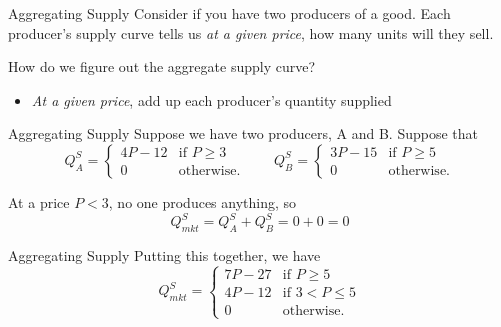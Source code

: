 \documentclass[12pt,t]{beamer}
\begin{document}
\begin{frame}{Aggregating Supply}
  Consider if you have two producers of a good. Each producer's supply curve tells us \emph{at a given price}, how many units will they sell.

  \bigskip
  How do we figure out the aggregate supply curve? 
  
  \pause 
  \begin{itemize}
    \item \emph{At a given price}, add up each producer's quantity supplied
  \end{itemize}
\end{frame}

\begin{frame}{Aggregating Supply}
  Suppose we have two producers, A and B. Suppose that
  $$
    Q_A^S =
    \begin{cases}
      4P - 12 & \text{if } P \geq 3 \\
      0       & \text{otherwise}.
    \end{cases} 
    \quad\quad
    Q_B^S =
    \begin{cases}
      3P - 15 & \text{if } P  \geq 5 \\
      0       & \text{otherwise}.
    \end{cases}
  $$

  \vspace{10mm}


   {
    At a price $P < 3$, no one produces anything, so 
    $$Q_{mkt}^S = Q_A^S + Q_B^S = 0 + 0 = 0$$ 
  }
\end{frame}

\begin{frame}{Aggregating Supply}
  Putting this together, we have 
  $$
    Q_{mkt}^S =
    \begin{cases}
      7P - 27 & \text{if } P \geq 5     \\
      4P - 12 & \text{if } 3 < P \leq 5 \\
      0       & \text{otherwise}.
    \end{cases}
  $$
\end{frame}
\end{document}
